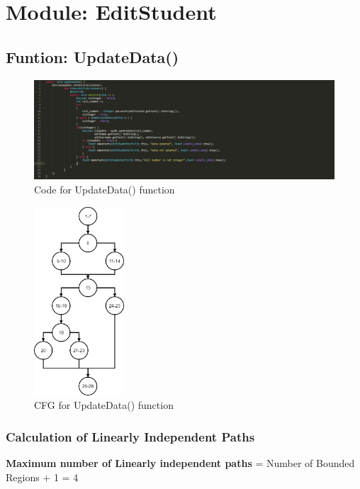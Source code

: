 \documentclass{scrreprt}
\begin{document}
\section{Module: EditStudent}
\subsection{Funtion: UpdateData()}
\begin{figure}[H]
\centering
\includegraphics[width=\textwidth, keepaspectratio]{updateDataCode.png}
\caption{Code for UpdateData() function}
\end{figure}

\begin{figure}[H]
\centering
\includegraphics[width=0.3\textwidth, keepaspectratio]{updateData.png}
\caption{CFG for UpdateData() function}
\end{figure}



\subsubsection{Calculation of Linearly Independent Paths}
\textbf{Maximum number of Linearly independent paths} = Number of Bounded Regions + 1 = 4
\end{document}
